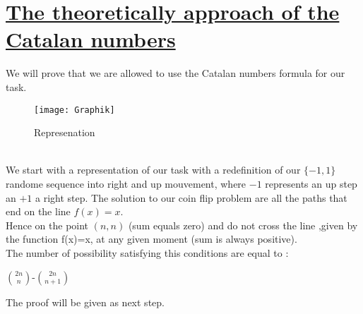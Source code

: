 \documentclass[a4paper,12pt,oneside]{article}
\begin{document}
\section{\underline{The theoretically approach of the Catalan numbers}}
\vspace{0.5cm}
We will prove that we are allowed to use the Catalan numbers formula for our task.
\begin{figure}[h]
\centering
\texttt{[image: Graphik]}
\caption{Represenation}
\end{figure}
\\
We start with a representation of our task with a redefinition of our $\{-1,1\}$ randome sequence into right and up mouvement, where $-1$ represents an up step an $+1$ a right step. The solution to our coin flip problem are all the paths that end on the line $f(x)=x$.
\\
Hence on the point $(n,n)$  (sum equals zero) and do not cross the line ,given by the function f(x)=x, at any given moment (sum is always positive).\\
The number of possibility satisfying this conditions are equal to : \\
\begin{center}
 $\binom{2n}{n}$-$\binom{2n}{n+1}$
\end{center}
The proof will be given as next step.
\newpage
\end{document}
